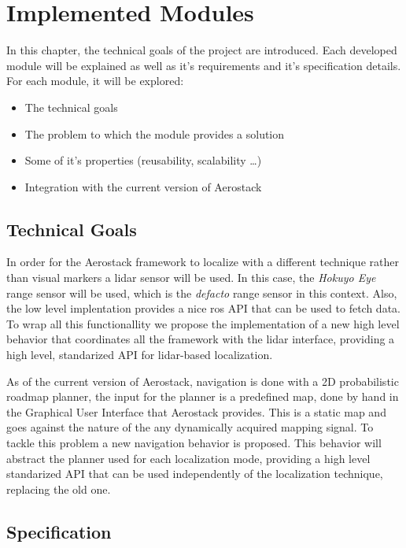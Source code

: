 \chapter{Implemented Modules}

In this chapter, the technical goals of the project are introduced. Each developed module will be explained as well as it's requirements and it's specification details. For each module, it will be explored:

\begin{itemize}
  \item The technical goals
  \item The problem to which the module provides a solution
  \item Some of it's properties (reusability, scalability \dots)
  \item Integration with the current version of Aerostack
\end{itemize}

\section{Technical Goals}

  In order for the Aerostack framework to localize with a different technique rather than visual markers a lidar sensor will be used. In this case, the \textit{Hokuyo Eye} range sensor will be used, which is the \textit{defacto} range sensor in this context. Also, the low level implentation provides a nice ros API that can be used to fetch data. To wrap all this functionallity we propose the implementation of a new high level behavior that coordinates all the framework with the lidar interface, providing a high level, standarized API for lidar-based localization.

  As of the current version of Aerostack, navigation is done with a 2D probabilistic roadmap planner, the input for the planner is a predefined map, done by hand in the Graphical User Interface that Aerostack provides. This is a static map and goes against the nature of the any dynamically acquired mapping signal. To tackle this problem a new navigation behavior is proposed. This behavior will abstract the planner used for each localization mode, providing a high level standarized API that can be used independently of the localization technique, replacing the old one.

\section{Specification}

